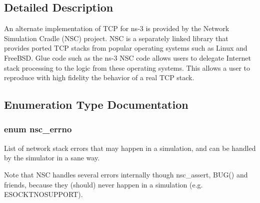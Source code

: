 \subsection{Detailed Description}
An alternate implementation of T\+CP for ns-\/3 is provided by the Network Simulation Cradle (N\+SC) project. N\+SC is a separately linked library that provides ported T\+CP stacks from popular operating systems such as Linux and Free\+B\+SD. Glue code such as the ns-\/3 N\+SC code allows users to delegate Internet stack processing to the logic from these operating systems. This allows a user to reproduce with high fidelity the behavior of a real T\+CP stack. 

\subsection{Enumeration Type Documentation}
\subsubsection[{\texorpdfstring{nsc\+\_\+errno}{nsc_errno}}]{\setlength{\rightskip}{0pt plus 5cm}enum {\bf nsc\+\_\+errno}}\hypertarget{group__nsctcp_gaf5042dc1e35574163a5542327727966c}{}\label{group__nsctcp_gaf5042dc1e35574163a5542327727966c}
List of network stack errors that may happen in a simulation, and can be handled by the simulator in a sane way.

Note that N\+SC handles several errors internally though nsc\+\_\+assert, B\+U\+G() and friends, because they (should) never happen in a simulation (e.\+g. E\+S\+O\+C\+K\+T\+N\+O\+S\+U\+P\+P\+O\+RT).

